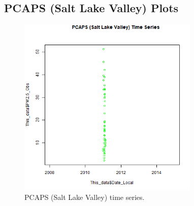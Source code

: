 
\subsection*{PCAPS (Salt Lake Valley) Plots}
\begin{figure} 
\centering 
\includegraphics[width=0.77\textwidth]{Code_Outputs/PCAPS_time_series.png} 
\caption{\label{fig:PCAPSTS}PCAPS (Salt Lake Valley) time series.} 
\end{figure} 
 
